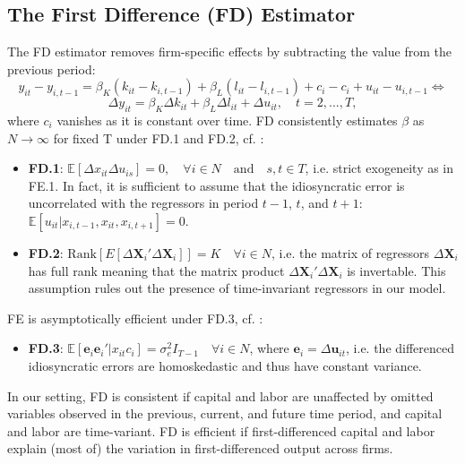\documentclass[11pt]{article}
\begin{document}
\subsection{The First Difference (FD) Estimator}
The FD estimator removes firm-specific effects by subtracting the value from the previous period: 
\begin{equation*}
    y_{it}-y_{i,t-1} = \beta_K(k_{it}-k_{i,t-1}) + \beta_L(l_{it}-l_{i,t-1})+c_i-c_i+u_{it}-u_{i,t-1} \Leftrightarrow 
\end{equation*}
\begin{equation}
\label{FD_model}
    \Delta y_{it}=\beta_K\Delta k_{it} + \beta_L \Delta l_{it} + \Delta u_{it}, \quad t=2,...,T,
\end{equation}
where $c_i$ vanishes as it is constant over time.  
FD consistently estimates $\beta$ as $N\rightarrow\infty$ for fixed T under FD.1 and FD.2, cf. \cite{Wooldrige_2010_10}:
\begin{itemize}
    \item[] \textbf{FD.1}: $\mathbb{E}[\Delta x_{it}\Delta u_{is}]=0, \quad \forall i\in N \quad \text{and} \quad s,t \in T$, i.e. strict exogeneity as in FE.1. In fact, it is sufficient to assume that the idiosyncratic error is uncorrelated with the regressors in period $t-1$, $t$, and $t+1$: $\mathbb{E}[u_{it}|x_{i,t-1},x_{it},x_{i,t+1}]=0$. 
    \item[] \textbf{FD.2}: $\text{Rank}\left[E[\Delta \textbf{X}_i'\Delta \textbf{X}_i]\right]=K \quad \forall i\in N$, i.e. the matrix of regressors $\Delta\textbf{X}_i$ has full rank meaning that the matrix product $\Delta\textbf{X}_i'\Delta \textbf{X}_i$ is invertable. This assumption rules out the presence of time-invariant regressors in our model. 
\end{itemize}
FE is asymptotically efficient under FD.3, cf. \cite{Wooldrige_2010_10}:
\begin{itemize}
    \item[] \textbf{FD.3}: $\mathbb{E}[\textbf{e}_i\textbf{e}_i'|x_{it} c_i]=\sigma^2_e I_{T-1} \quad \forall i\in N$, where $\textbf{e}_i= \Delta \textbf{u}_{it}$, i.e. the differenced idiosyncratic errors are homoskedastic and thus have constant variance. 
\end{itemize}
In our setting, FD is consistent if capital and labor are unaffected by omitted variables observed in the previous, current, and future time period, and capital and labor are time-variant. FD is efficient if first-differenced capital and labor explain (most of) the variation in first-differenced output across firms. 
\end{document}
